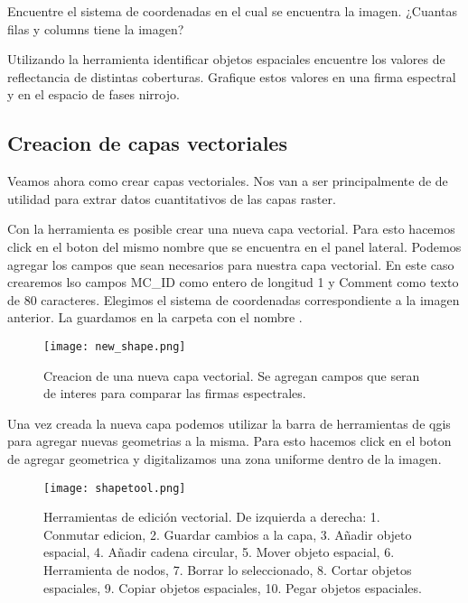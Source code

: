 \begin{act}
    Encuentre el sistema de coordenadas en el cual se encuentra la imagen.
    ¿Cuantas filas y columns tiene la imagen?
\end{act}

\begin{act}
   Utilizando la herramienta identificar objetos espaciales encuentre los
   valores de reflectancia de distintas coberturas. Grafique estos  valores en
   una firma espectral y en el espacio de fases nirrojo.
\end{act}

\subsection{Creacion de capas vectoriales}

Veamos ahora como crear capas vectoriales. Nos van a ser principalmente de
de utilidad para extrar datos cuantitativos de las capas raster.

Con la herramienta  es posible crear una nueva
capa vectorial. Para esto hacemos click en el boton del mismo nombre que se
encuentra en el panel lateral. Podemos agregar los campos que sean necesarios
para nuestra capa vectorial. En este caso crearemos lso campos MC\_ID como
entero de longitud 1 y Comment como texto de 80 caracteres. Elegimos el sistema
de coordenadas correspondiente a la imagen anterior. La guardamos en la carpeta
 con el nombre .

\begin{figure}[h!]
\begin{center}
    \texttt{[image: new\_shape.png]}
\end{center}
\caption{Creacion de una nueva capa vectorial. Se agregan campos que seran de
    interes para comparar las firmas espectrales. }
\label{fig:newshape}
\end{figure}


Una vez creada la nueva capa podemos utilizar la barra de herramientas de qgis
para agregar nuevas geometrias a la misma. Para esto hacemos click en el boton
de agregar geometrica y digitalizamos una zona uniforme dentro de la imagen.
\begin{figure}[h!]
\begin{center}
    \texttt{[image: shapetool.png]}
\end{center}
\caption{Herramientas de edición vectorial. De izquierda a derecha: 1. Conmutar
    edicion, 2. Guardar cambios a la capa, 3. Añadir objeto espacial, 4. Añadir
    cadena circular, 5. Mover objeto espacial, 6. Herramienta de nodos, 7.
    Borrar lo seleccionado, 8. Cortar objetos espaciales, 9. Copiar objetos
    espaciales, 10. Pegar objetos espaciales.}
\label{fig:shapetool}
\end{figure}


